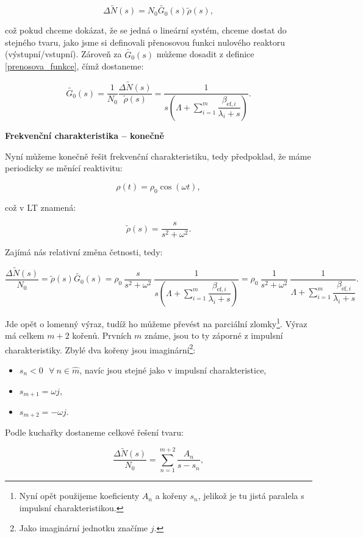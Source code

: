 $$ \Delta \tilde{N}(s) = N_0 \tilde{G_0}(s) \tilde{\rho} (s), $$

což pokud chceme dokázat, že se jedná o lineární systém, chceme dostat do stejného tvaru, jako jsme si definovali přenosovou funkci nulového reaktoru (výstupní/vstupní). Zároveň za $\tilde{G_0}(s)$ můžeme dosadit z definice \eqref{prenosova_funkce}, čímž dostaneme:

$$ \tilde{G_0}(s) = \dfrac{1}{N_0} \dfrac{\Delta \tilde{N}(s)} {\tilde{\rho}(s)} = \dfrac{1}{s \left ( \Lambda + \sum_{i=1}^m \dfrac{\beta_{\text{ef},i}}{\lambda_i + s} \right )}.$$

\textbf{Frekvenční charakteristika -- konečně}

Nyní můžeme konečně řešit frekvenční charakteristiku, tedy předpoklad, že máme periodicky se měnící reaktivitu:

$$ \rho(t) = \rho_0 \cos (\omega t), $$

což v LT znamená:

$$ \tilde{\rho}(s) = \dfrac{s}{s^2 + \omega^2}. $$

Zajímá nás relativní změna četnosti, tedy:

$$ \dfrac{\Delta \tilde{N}(s)}{N_0} = \tilde{\rho}(s) \tilde{G_0}(s) = \rho_0 \: \dfrac{s}{s^2 + \omega^2} \: \dfrac{1}{s \left ( \Lambda + \sum_{i=1}^m \dfrac{\beta_{\text{ef},i}}{\lambda_i + s} \right )} = \rho_0 \: \dfrac{1}{s^2 + \omega^2} \: \dfrac{1}{\Lambda + \sum_{i=1}^m \dfrac{\beta_{\text{ef},i}}{\lambda_i + s}}. $$

Jde opět o lomenný výraz, tudíž ho můžeme převést na parciální zlomky\footnote{Nyní opět použijeme koeficienty $A_n$ a kořeny $s_n$, jelikož je tu jistá paralela s impulsní charakteristikou.}. Výraz má celkem $m+2$ kořenů. Prvních $m$ známe, jsou to ty záporné z impulsní charakteristiky. Zbylé dva kořeny jsou imaginární\footnote{Jako imaginární jednotku značíme $j$.}:

\begin{itemize}
  \item $s_n < 0 \: \: \: \forall \: n \in \widehat{m}$, navíc jsou stejné jako v impulsní charakteristice,
  \item $s_{m+1} = \omega j$,
  \item $s_{m+2} = - \omega j$.
\end{itemize}

Podle kuchařky dostaneme celkové řešení tvaru:

$$ \dfrac{\Delta \tilde{N}(s)}{N_0} = \sum_{n = 1}^{m+2} \dfrac{A_n}{s-s_n}, $$

